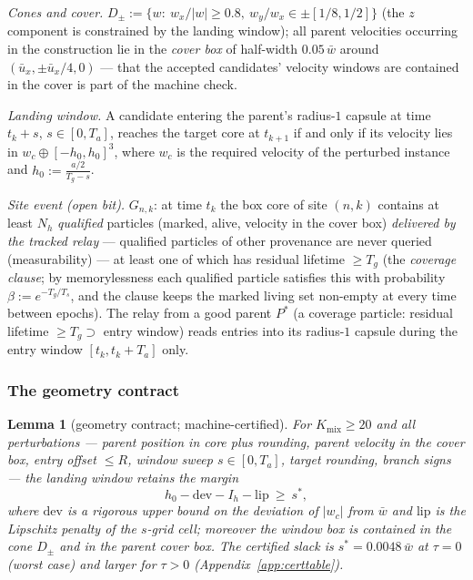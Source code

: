 \documentclass[11pt]{article}
\newtheorem{lemma}{Lemma}
\newcommand{\Kmix}{K_{\mathrm{mix}}}
\newcommand{\Ts}{T_s}
\newcommand{\Ta}{T_a}
\newcommand{\Tg}{T_g}
\newcommand{\wbar}{\bar w}
\begin{document}
\emph{Cones and cover.} $D_\pm:=\{w:\ w_x/|w|\ge0.8,\ w_y/w_x\in
\pm[1/8,1/2]\}$ (the $z$ component is constrained by the landing window);
all parent velocities occurring in the construction lie in the \emph{cover
box} of half-width $0.05\,\wbar$ around $(\bar u_x,\pm\bar u_x/4,0)$ ---
that the accepted candidates' velocity windows are contained in the cover
is part of the machine check.

\emph{Landing window.} A candidate entering the parent's radius-$1$
capsule at time $t_k+s$, $s\in[0,\Ta]$, reaches the target core at
$t_{k+1}$ if and only if its velocity lies in $w_c\oplus[-h_0,h_0]^3$,
where $w_c$ is the required velocity of the perturbed instance and
$h_0:=\frac{a/2}{\Tg-s}$.

\emph{Site event (open bit).} $G_{n,k}$: at time $t_k$ the box core of site
$(n,k)$ contains at least $N_h$ \emph{qualified} particles (marked, alive,
velocity in the cover box) \emph{delivered by the tracked relay} ---
qualified particles of other provenance are never queried
(measurability) --- at least one of which has residual lifetime $\ge\Tg$
(the \emph{coverage clause}; by memorylessness each qualified particle
satisfies this with probability $\beta:=e^{-\Tg/\Ts}$, and the clause keeps
the marked living set non-empty at every time between epochs). The relay
from a good parent $P^*$ (a coverage particle: residual lifetime
$\ge\Tg\supset$ entry window) reads entries into its radius-$1$ capsule
during the entry window $[t_k,t_k+\Ta]$ only.

\subsubsection{The geometry contract}\label{app:c2geo}

\begin{lemma}[geometry contract; machine-certified]\label{lem:geo}
For $\Kmix\ge20$ and all perturbations --- parent position in core plus
rounding, parent velocity in the cover box, entry offset $\le R$, window
sweep $s\in[0,\Ta]$, target rounding, branch signs --- the landing window
retains the margin
\[
  h_0-\mathrm{dev}-I_h-\mathrm{lip}\ \ge\ s^*,
\]
where $\mathrm{dev}$ is a rigorous upper bound on the deviation of $|w_c|$
from $\wbar$ and $\mathrm{lip}$ is the Lipschitz penalty of the $s$-grid
cell; moreover the window box is contained in the cone $D_\pm$ and in the
parent cover box. The certified slack is $s^*=0.0048\,\wbar$ at $\tau=0$
(worst case) and larger for $\tau>0$ (Appendix~\ref{app:certtable}).
\end{lemma}
\end{document}
